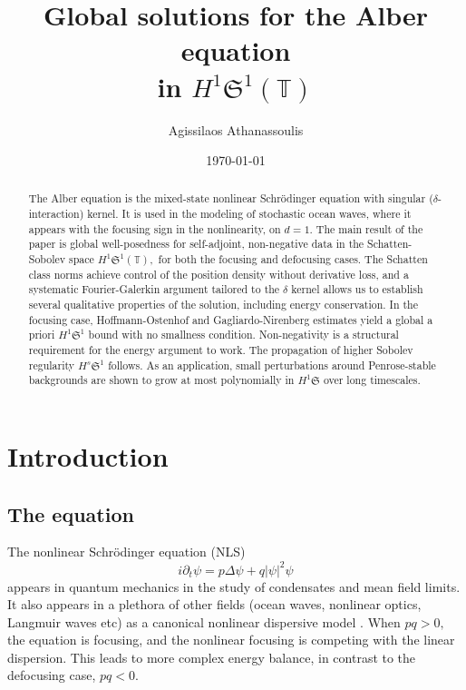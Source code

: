 \documentclass[11pt]{amsart}
\theoremstyle{definition}
\newcommand{\T}{\mathbb{T}}
\newcommand{\Sp}{\mathfrak{S}}
\begin{document}
\title{
Global solutions for the Alber equation \\ in $H^1\Sp^1(\mathbb{T})$}
\author{Agissilaos Athanassoulis}
\address{Department of Mathematics, University of Dundee}
\date{\today}


\begin{abstract}
The Alber equation is the mixed-state  nonlinear Schr\"odinger equation with singular ($\delta$-interaction) kernel. It is used in the modeling of stochastic ocean waves, where it appears with the focusing sign in the nonlinearity, on $d=1.$ 
The main result of the paper is global well-posedness for self-adjoint, non-negative data in the Schatten-Sobolev space $H^1\mathfrak{S}^1(\T),$ for both the focusing and defocusing cases.
The Schatten class norms  achieve  control of the position density without derivative loss, and
a systematic Fourier-Galerkin argument tailored to the $\delta$ kernel allows us to establish several qualitative properties of the solution, including  energy conservation. In the focusing case, Hoffmann-Ostenhof and Gagliardo-Nirenberg estimates yield a global a priori $H^1\mathfrak{S}^1$ bound with no smallness condition. Non-negativity is a structural requirement for the energy argument to work. The propagation of higher Sobolev regularity $H^s\mathfrak{S}^1$   follows. As an application, small perturbations around Penrose-stable backgrounds are  shown to grow at most polynomially in $H^1\mathfrak{S}$ over long timescales.
\end{abstract}

\maketitle


\section{Introduction}\label{sec:intro}

\subsection{The equation}
The nonlinear Schr\"odinger equation (NLS)
\begin{equation}\label{eq:nls}
	i \partial_t \psi = p\Delta \psi + q |\psi|^2 \psi
\end{equation}
appears in quantum mechanics in the study of condensates and mean field limits. It also appears in a plethora of other fields (ocean waves, nonlinear optics, Langmuir waves etc) as a canonical nonlinear dispersive model \cite{MeiStiassnieYue2005b,SulemSulem1999}. When $pq>0,$ the equation is focusing, and the nonlinear focusing is competing with the linear dispersion. This leads to more complex energy balance, in contrast to the defocusing case,   $pq<0.$ 
\end{document}
